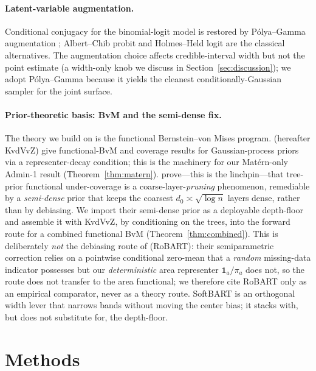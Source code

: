 \documentclass[11pt]{article}
\theoremstyle{remark}
\newcommand{\dz}{d_0}
\begin{document}
\paragraph{Latent-variable augmentation.}
Conditional conjugacy for the binomial-logit model is restored by P\'olya--Gamma
augmentation \citep{polson2013polyagamma}; Albert--Chib probit
\citep{albert1993bayesian} and Holmes--Held logit \citep{holmes2006bayesian} are
the classical alternatives. The augmentation choice affects credible-interval
width but not the point estimate (a width-only knob we discuss in
Section~\ref{sec:discussion}); we adopt P\'olya--Gamma because it yields the
cleanest conditionally-Gaussian sampler for the joint surface.

\paragraph{Prior-theoretic basis: BvM and the semi-dense fix.}
The theory we build on is the functional Bernstein--von Mises program.
\citet{knapik2011bayesian} (hereafter KvdVvZ) give functional-BvM and coverage
results for Gaussian-process priors via a representer-decay condition; this is the
machinery for our Mat\'ern-only Admin-1 result (Theorem~\ref{thm:matern}).
\citet{castillo2021cart} prove---this is the linchpin---that tree-prior functional
under-coverage is a coarse-layer-\emph{pruning} phenomenon, remediable by a
\emph{semi-dense} prior that keeps the coarsest $\dz \asymp \sqrt{\log n}$ layers
dense, rather than by debiasing. We import their semi-dense prior as a deployable
depth-floor and assemble it with KvdVvZ, by conditioning on the trees, into the
forward route for a combined functional BvM (Theorem~\ref{thm:combined}). This is
deliberately \emph{not} the debiasing route of \citet{breunig2025robart} (RoBART):
their semiparametric correction relies on a pointwise conditional zero-mean that a
\emph{random} missing-data indicator \citep[in the sense of][]{little2019statistical}
possesses but our \emph{deterministic} area
representer $\mathbf 1_a/\pi_a$ does not, so the route does not transfer to the
area functional; we therefore cite RoBART only as an empirical comparator, never
as a theory route. SoftBART \citep{linero2018soft} is an orthogonal width lever
that narrows bands without moving the center bias; it stacks with, but does not
substitute for, the depth-floor.

\section{Methods}\label{sec:methods}
\end{document}
